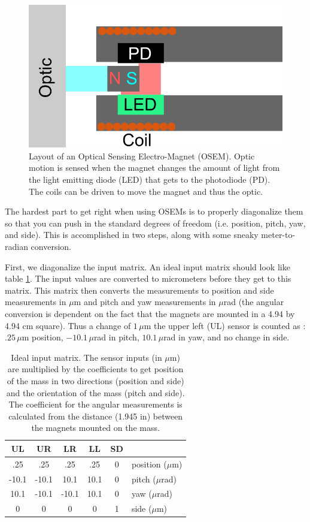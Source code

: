 \begin{figure}[hp]
	\centering
		\includegraphics[width=.5\textwidth]{figures/suspensions/OSEM.png}
	\caption[OSEM diagram]{Layout of an Optical Sensing Electro-Magnet (OSEM). Optic motion is sensed when the magnet changes the amount of light from the light emitting diode (LED) that gets to the photodiode (PD). The coils can be driven to move the magnet and thus the optic.}
	\label{fig:osem}
\end{figure}

The hardest part to get right when using OSEMs is to properly diagonalize them so that you can push in the standard degrees of freedom (i.e. position, pitch, yaw, and side). This is accomplished in two steps, along with some sneaky meter-to-radian conversion. 

First, we diagonalize the input matrix. An ideal input matrix should look like table \ref{tab:idealDiag}. The input values are converted to micrometers before they get to this matrix. This matrix then converts the measurements to position and side measurements in $\mu$m and pitch and yaw measurements in $\mu$rad (the angular conversion is dependent on the fact that the magnets are mounted in a 4.94 by 4.94 cm square). Thus a change of $1\, \mu$m the upper left (UL) sensor is counted as : $.25 \,\mu$m position, $-10.1 \,\mu$rad in pitch, $10.1 \,\mu$rad in yaw, and no change in side.

\begin{table}[htbp]
\centering
\begin{tabular}{| c | c | c |c | c | l}
\bf{UL}& \bf{UR} & \bf{LR}  & \bf{LL} & \bf{SD}\\ \hline
  .25 & .25 & .25 & .25 & 0 &position ($\mu$m)\\
 -10.1 &-10.1 & 10.1 & 10.1 & 0 &pitch ($\mu$rad)\\
  10.1 &-10.1 &-10.1 & 10.1 & 0 &yaw ($\mu$rad)\\
  0 & 0 & 0 & 0 & 1 &side ($\mu$m)\\ \hline
\end{tabular}
\caption[Ideal diagonalization]{Ideal input matrix. The sensor inputs (in $\mu$m) are multiplied by the coefficients to get position of the mass in two directions (position and side) and the orientation of the mass (pitch and side). The coefficient for the angular measurements is calculated from the distance (1.945 in) between the magnets mounted on the mass.}
\label{tab:idealDiag}
\end{table}

